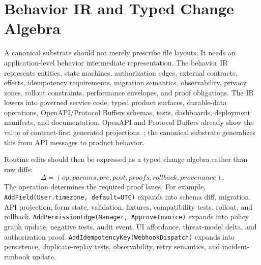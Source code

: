 \section{Behavior IR and Typed Change Algebra}
\label{sec:behavior-ir}

A canonical substrate should not merely prescribe file layouts. It needs an application-level behavior intermediate representation. The behavior IR represents entities, state machines, authorization edges, external contracts, effects, idempotency requirements, migration semantics, observability, privacy zones, rollout constraints, performance envelopes, and proof obligations. The IR lowers into governed service code, typed product surfaces, durable-data operations, OpenAPI/Protocol Buffers schemas, tests, dashboards, deployment manifests, and documentation. OpenAPI and Protocol Buffers already show the value of contract-first generated projections~\cite{openapi31,protobufOverview}; the canonical substrate generalizes this from API messages to product behavior.

Routine edits should then be expressed as a typed change algebra rather than raw diffs:
\begin{equation}
\Delta = (op,params,pre,post,proofs,rollback,provenance).
\end{equation}
The operation determines the required proof lanes. For example, \texttt{AddField(User.timezone, default=UTC)} expands into schema diff, migration, API projection, form state, validation, fixtures, compatibility tests, rollout, and rollback. \texttt{AddPermissionEdge(Manager, ApproveInvoice)} expands into policy graph update, negative tests, audit event, UI affordance, threat-model delta, and authorization proof. \texttt{AddIdempotencyKey(WebhookDispatch)} expands into persistence, duplicate-replay tests, observability, retry semantics, and incident-runbook update.

